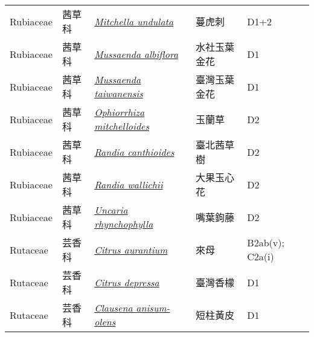 {\begin{longtable}{p{2.5cm}p{2.5cm}p{4.5cm}p{2.5cm}p{3cm}}
    Rubiaceae & 茜草科 & \href{http://www.theplantlist.org/tpl1.1/search?q=Mitchella+undulata}{\textit{Mitchella undulata} } & 蔓虎刺 & D1+2 \index{Mitchella@\textit{Mitchella}!undulata@\textit{undulata}}  \index{蔓虎刺} \\
    Rubiaceae & 茜草科 & \href{http://www.theplantlist.org/tpl1.1/search?q=Mussaenda+albiflora}{\textit{Mussaenda albiflora} } & 水社玉葉金花 & D1 \index{Mussaenda@\textit{Mussaenda}!albiflora@\textit{albiflora}}  \index{水社玉葉金花} \\
    Rubiaceae & 茜草科 & \href{http://www.theplantlist.org/tpl1.1/search?q=Mussaenda+taiwanensis}{\textit{Mussaenda taiwanensis} } & 臺灣玉葉金花 & D1 \index{Mussaenda@\textit{Mussaenda}!taiwanensis@\textit{taiwanensis}}  \index{臺灣玉葉金花} \\
    Rubiaceae & 茜草科 & \href{http://www.theplantlist.org/tpl1.1/search?q=Ophiorrhiza+mitchelloides}{\textit{Ophiorrhiza mitchelloides} } & 玉蘭草 & D2 \index{Ophiorrhiza@\textit{Ophiorrhiza}!mitchelloides@\textit{mitchelloides}}  \index{玉蘭草} \\
    Rubiaceae & 茜草科 & \href{http://www.theplantlist.org/tpl1.1/search?q=Randia+canthioides}{\textit{Randia canthioides} } & 臺北茜草樹 & D2 \index{Randia@\textit{Randia}!canthioides@\textit{canthioides}}  \index{臺北茜草樹} \\
    Rubiaceae & 茜草科 & \href{http://www.theplantlist.org/tpl1.1/search?q=Randia+wallichii}{\textit{Randia wallichii} } & 大果玉心花 & D2 \index{Randia@\textit{Randia}!wallichii@\textit{wallichii}}  \index{大果玉心花} \\
    Rubiaceae & 茜草科 & \href{http://www.theplantlist.org/tpl1.1/search?q=Uncaria+rhynchophylla}{\textit{Uncaria rhynchophylla} } & 嘴葉鉤藤 & D2 \index{Uncaria@\textit{Uncaria}!rhynchophylla@\textit{rhynchophylla}}  \index{嘴葉鉤藤} \\
    Rutaceae & 芸香科 & \href{http://www.theplantlist.org/tpl1.1/search?q=Citrus+aurantium}{\textit{Citrus aurantium} } & 來母 & B2ab(v); C2a(i) \index{Citrus@\textit{Citrus}!aurantium@\textit{aurantium}}  \index{來母} \\
    Rutaceae & 芸香科 & \href{http://www.theplantlist.org/tpl1.1/search?q=Citrus+depressa}{\textit{Citrus depressa} } & 臺灣香檬 & D1 \index{Citrus@\textit{Citrus}!depressa@\textit{depressa}}  \index{臺灣香檬} \\
    Rutaceae & 芸香科 & \href{http://www.theplantlist.org/tpl1.1/search?q=Clausena+anisum-olens}{\textit{Clausena anisum-olens} } & 短柱黃皮 & D1 \index{Clausena@\textit{Clausena}!anisum-olens@\textit{anisum-olens}}  \index{短柱黃皮} \\

\end{longtable}}
